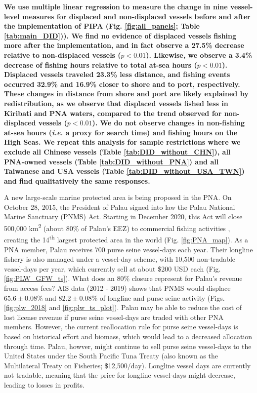 \documentclass[12pt]{article}
\begin{document}
\textbf{We use multiple linear regression to measure the change in nine vessel-level measures for displaced and non-displaced vessels before and after the implementation of PIPA (Fig. \ref{fig:all_panels}; Table \ref{tab:main_DID})). We find no evidence of displaced vessels fishing more after the implementation, and in fact observe a 27.5\% decrease relative to non-displaced vessels ($p < 0.01$). Likewise, we observe a 3.4\% decrease of fishing hours relative to total at-sea hours ($p < 0.01$). Displaced vessels traveled 23.3\% less distance, and fishing events occurred 32.9\% and 16.9\% closer to shore and to port, respectively. These changes in distance from shore and port are likely explained by redistribution, as we observe that displaced vessels fished less in Kiribati and PNA waters, compared to the trend observed for non-displaced vessels ($p < 0.01$). We do not observe changes in non-fishing at-sea hours (\emph{i.e.} a proxy for search time) and fishing hours on the High Seas. We repeat this analysis for sample restrictions where we exclude all Chinese vessels (Table \ref{tab:DID_without_CHN}), all PNA-owned vessels (Table \ref{tab:DID_without_PNA}) and all Taiwanese and USA vessels (Table \ref{tab:DID_without_USA_TWN}) and find qualitatively the same responses.}

A new large-scale marine protected area is being proposed in the PNA. On October 28, 2015, the President of Palau signed into law the Palau National Marine Sanctuary (PNMS) Act. Starting in December 2020, this Act will close 500,000 km\textsuperscript{2} (about 80\% of Palau's EEZ) to commercial fishing activities \cite{cimino_2019}, creating the 14\textsuperscript{th} largest protected area in the world (Fig. \ref{fig:PNA_map}). As a PNA member, Palau receives 700 purse seine vessel-days each year. Their longline fishery is also managed under a vessel-day scheme, with 10,500 non-tradable vessel-days per year, which currently sell at about \$200 USD each (Fig. \ref{fig:PLW_GFW_ts}). What does an 80\% closure represent for Palau's revenue from access fees? AIS data (2012 - 2019) shows that PNMS would displace $65.6 \pm 0.08$\% and $82.2 \pm 0.08$\% of longline and purse seine activity (Figs. \ref{fig:plw_2018} and \ref{fig:plw_ts_plot}). Palau may be able to reduce the cost of lost license revenue if purse seine vessel-days are traded with other PNA members. However, the current reallocation rule for purse seine vessel-days is based on historical effort and biomass, which would lead to a decreased allocation through time. Palau, howver, might continue to sell purse seine vessel-days to the United States under the South Pacific Tuna Treaty (also known as the Multilateral Treaty on Fisheries; \$12,500/day). Longline vessel days are currently not tradable, meaning that the price for longline vessel-days might decrease, leading to losses in profits.
\end{document}
